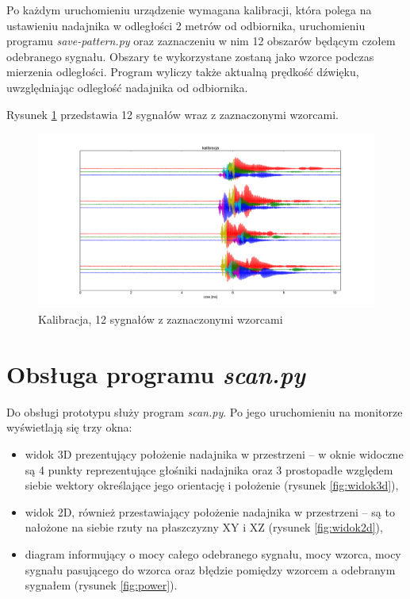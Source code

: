 Po każdym uruchomieniu urządzenie wymagana kalibracji,
która polega na ustawieniu nadajnika w odległości 2 metrów od odbiornika,
uruchomieniu programu \textit{save-pattern.py} oraz zaznaczeniu w nim 12 obszarów  będącym czołem odebranego sygnału.
Obszary te wykorzystane zostaną jako wzorce podczas mierzenia odległości.
Program wyliczy także aktualną prędkość dźwięku, uwzględniając odległość nadajnika od odbiornika.

Rysunek \ref{fig:kalibracja_12x} przedstawia 12 sygnałów wraz z zaznaczonymi wzorcami.


 \begin{figure}[ht]
    \centering
    \includegraphics[width=1.0\textwidth, trim= 50mm 0mm 40mm 0mm,clip]{kalibracja_12x}
    \caption{Kalibracja, 12 sygnałów z zaznaczonymi wzorcami}
    \label{fig:kalibracja_12x}
\end{figure}

\newpage

\section{Obsługa programu \textit{scan.py}}

Do obsługi prototypu służy program \textit{scan.py}. Po jego uruchomieniu 
na monitorze wyświetlają się trzy okna: 
\begin{itemize}
 \item widok 3D prezentujący położenie nadajnika w przestrzeni -- w oknie widoczne są  
 4 punkty reprezentujące głośniki nadajnika oraz 3 prostopadłe względem siebie wektory określające 
jego orientację i położenie (rysunek \ref{fig:widok3d}),
 \item widok 2D, również przestawiający położenie nadajnika w przestrzeni --
 są to nałożone na siebie rzuty na płaszczyzny XY i XZ
 (rysunek \ref{fig:widok2d}),
 \item diagram informujący o mocy całego odebranego sygnału, mocy wzorca, mocy sygnału pasującego do wzorca 
 oraz błędzie pomiędzy wzorcem a odebranym sygnałem (rysunek \ref{fig:power}).
\end{itemize}

